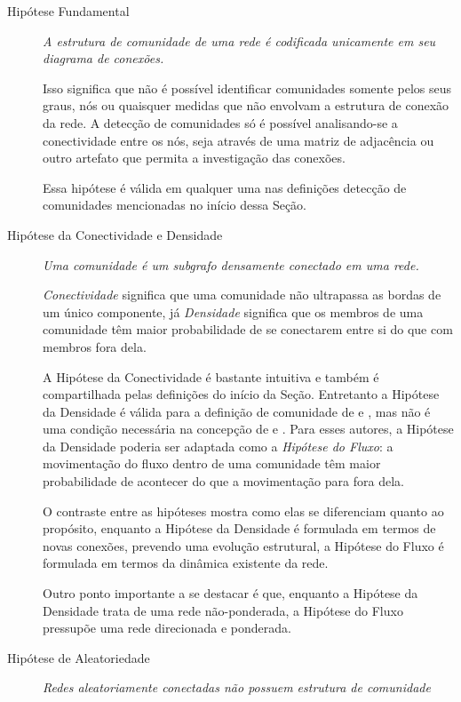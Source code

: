\documentclass[12pt,a4paper]{article}
\begin{document}
\begin{description}
\item [Hipótese Fundamental] \textit{A estrutura de comunidade de uma rede é codificada unicamente em seu diagrama de conexões.}

Isso significa que não é possível identificar comunidades somente pelos seus graus, nós ou quaisquer medidas que não envolvam a estrutura de conexão da rede. A detecção de comunidades só é possível analisando-se a conectividade entre os nós, seja através de uma matriz de adjacência ou outro artefato que permita a investigação das conexões.

Essa hipótese é válida em qualquer uma nas definições detecção de comunidades mencionadas no início dessa Seção.

\item [Hipótese da Conectividade e Densidade] \textit{Uma comunidade é um subgrafo densamente conectado em uma rede.}

\textit{Conectividade} significa que uma comunidade não ultrapassa as bordas de um único componente, já \textit{Densidade} significa que os membros de uma comunidade têm maior probabilidade de se conectarem entre si do que com membros fora dela.

A Hipótese da Conectividade é bastante intuitiva e também é compartilhada pelas definições do início da Seção. Entretanto a Hipótese da Densidade é válida para a definição de comunidade de  e , mas não é uma condição necessária na concepção de  e . Para esses autores, a Hipótese da Densidade poderia ser adaptada como a \textit{Hipótese do Fluxo}: a movimentação do fluxo dentro de uma comunidade têm maior probabilidade de acontecer do que a movimentação para fora dela.

O contraste entre as hipóteses mostra como elas se diferenciam quanto ao propósito, enquanto a Hipótese da Densidade é formulada em termos de novas conexões, prevendo uma evolução estrutural, a Hipótese do Fluxo é formulada em termos da dinâmica existente da rede.

Outro ponto importante a se destacar é que, enquanto a Hipótese da Densidade trata de uma rede não-ponderada, a Hipótese do Fluxo pressupõe uma rede direcionada e ponderada.

\item [Hipótese de Aleatoriedade] \textit{Redes aleatoriamente conectadas não possuem estrutura de comunidade}


\end{description}
\end{document}
